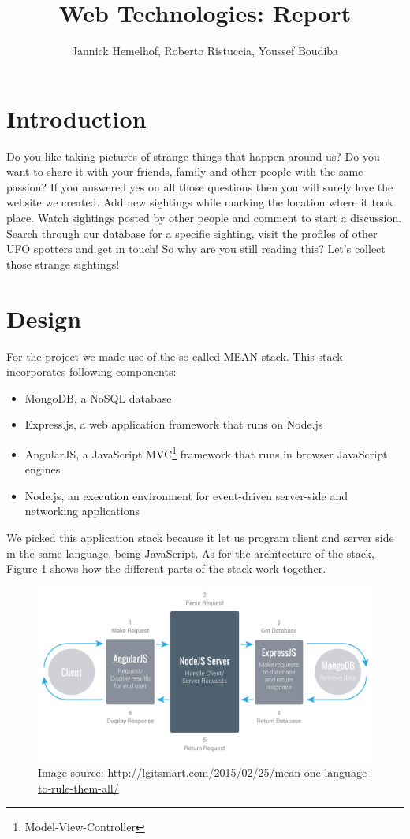 \documentclass{article}
\title{Web Technologies: Report}
\author{Jannick Hemelhof, Roberto Ristuccia, Youssef Boudiba}
\begin{document}
\maketitle
\newpage
\tableofcontents
\newpage
{}

\section{Introduction}
Do you like taking pictures of strange things that happen around us? Do you want to share it with your friends, family and other people with the same passion? If you answered yes on all those questions then you will surely love the website we created. Add new sightings while marking the location where it took place. Watch sightings posted by other people and comment to start a discussion. Search through our database for a specific sighting, visit the profiles of other UFO spotters and get in touch! So why are you still reading this? Let's collect those strange sightings!

\section{Design}
For the project we made use of the so called MEAN stack. This stack incorporates following components:
\begin{itemize}
\item MongoDB, a NoSQL database
\item Express.js, a web application framework that runs on Node.js
\item AngularJS, a JavaScript MVC\footnote{ Model-View-Controller} framework that runs in browser JavaScript engines
\item Node.js, an execution environment for event-driven server-side and networking applications
\end{itemize}
We picked this application stack because it let us program client and server side in the same language, being JavaScript. 
As for the architecture of the stack, Figure 1 shows how the different parts of the stack work together.
\begin{figure}[hb]%
  \centering
  \includegraphics[width=15cm]{architecture}
  \caption{Image source: \url{http://lgitsmart.com/2015/02/25/mean-one-language-to-rule-them-all/}}
  \label{fig:test}
\end{figure}
\end{document}
